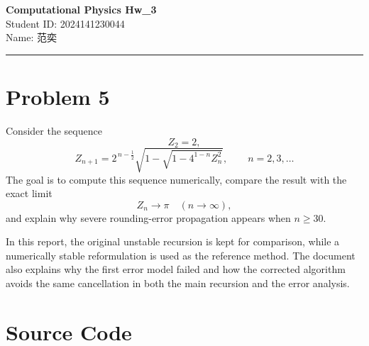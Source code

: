 \documentclass[12pt,a4paper]{article}
\newcommand{\HomeworkTitle}{Computational Physics Hw\_3}
\newcommand{\StudentID}{2024141230044}
\newcommand{\StudentName}{范奕}
\begin{document}
\begin{center}
    {\LARGE \textbf{\HomeworkTitle}}\\[1.2em]
    {\large Student ID: \StudentID}\\[0.5em]
    {\large Name: \StudentName}
\end{center}

\vspace{1em}
\noindent\rule{\textwidth}{0.8pt}
\vspace{1.5em}

\section*{Problem 5}

Consider the sequence
\[
Z_2 = 2,
\]
\[
Z_{n+1} = 2^{\,n-\frac12}\sqrt{1-\sqrt{1-4^{1-n}Z_n^2}},
\qquad n=2,3,\dots
\]
The goal is to compute this sequence numerically, compare the result with the exact limit
\[
Z_n \to \pi \quad (n\to\infty),
\]
and explain why severe rounding-error propagation appears when $n \ge 30$.

In this report, the original unstable recursion is kept for comparison, while a numerically stable reformulation is used as the reference method. The document also explains why the first error model failed and how the corrected algorithm avoids the same cancellation in both the main recursion and the error analysis.

\newpage
\tableofcontents
\newpage

\section{Source Code}
\end{document}

